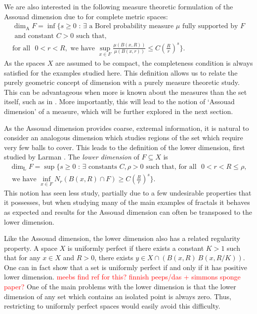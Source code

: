 We are also interested in the following measure theoretic formulation of the Assouad dimension due to \cite{luksak-saksman, konyagin-volberg} for complete metric spaces: 
\begin{multline*} 
\dim_{\text{A}} F = \inf \Bigg\{ s \geq 0 \, \,  : \, \exists \text{ a Borel probability measure } \mu \text{ fully supported by }F \\  \text{ and constant }C > 0\text{  such that,} \\ \text{for all } \, \, 0< r< R, \text{ we have  }  \sup_{x\in F} \frac{\mu(B(x,R))}{\mu(B(x,r))} \leq C\left(\frac{R}{r}\right)^{s} \Bigg\}.
\end{multline*}
As the spaces $X$ are assumed to be compact, the completeness condition is always satisfied for the examples studied here. This definition allows us to relate the purely geometric concept of dimension with a purely measure theoretic study. This can be advantageous when more is known about the measures than the set itself, such as in \cite{fraser-howroyd1}. More importantly, this will lead to the notion of `Assouad dimension' of a measure, which will be further explored in the next section. 


As the Assouad dimension provides coarse, extremal information, it is natural to consider an analogous dimension which studies regions of the set which require very few balls to cover. This leads to the definition of the lower dimension, first studied by Larman \cite{larman1,larman2}. The \textit{lower dimension} of $F \subseteq X$ is 
\begin{multline*}
\dim_{\text{L}} F = \sup \Bigg\{ s \geq 0 \, \,  : \, \exists \text{ constants }C, \rho > 0 \text{ such that, for all } \, \, 0< r< R \leq \rho,\\ \text{ we have  }\inf_{x\in F} N_r (B(x,R)\cap F) \geq C\left(\frac{R}{r}\right)^{s} \Bigg\}.
\end{multline*}
This notion has seen less study, partially due to a few undesirable properties that it possesses, but when studying many of the main examples of fractals it behaves as expected and results for the Assouad dimension can often be transposed to the lower dimension. 

Like the Assouad dimension, the lower dimension also has a related regularity property. A space $X$ is uniformly perfect if there exists a constant $K > 1$ such that for any $x \in X$ and $R > 0$, there exists $y \in X \cap \left(B(x, R) \ B(x, R/K)\right)$. One can in fact show that a set is uniformly perfect if and only if it has positive lower dimension. \textcolor{red}{meebs find ref for this? finnish peeps/das + simmons sponge paper?} One of the main problems with the lower dimension is that the lower dimension of any set which contains an isolated point is always zero. Thus, restricting to uniformly perfect spaces would easily avoid this difficulty. 

